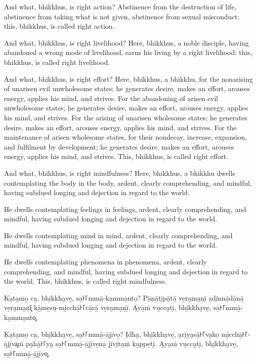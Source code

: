 And what, bhikkhus, is right action? Abstinence from the destruction of life,
abstinence from taking what is not given, abstinence from sexual misconduct:
this, bhikkhus, is called right action.

And what, bhikkhus, is right livelihood? Here, bhikkhus, a noble disciple,
having abandoned a wrong mode of livelihood, earns his living by a right
livelihood: this, bhikkhus, is called right livelihood.

And what, bhikkhus, is right effort? Here, bhikkhus, a bhikkhu, for the
nonarising of unarisen evil unwholesome states; he generates desire, makes an
effort, arouses energy, applies his mind, and strives. For the abandoning of
arisen evil unwholesome states; he generates desire, makes an effort, arouses
energy, applies his mind, and strives. For the arising of unarisen wholesome
states; he generates desire, makes an effort, arouses energy, applies his mind,
and strives. For the maintenance of arisen wholesome states, for their nondecay,
increase, expansion, and fulfilment by development; he generates desire, makes
an effort, arouses energy, applies his mind, and strives. This, bhikkhus, is
called right effort.

And what, bhikkhus, is right mindfulness? Here, bhikkhus, a bhikkhu dwells
contemplating the body in the body, ardent, clearly comprehending, and mindful,
having subdued longing and dejection in regard to the world.

He dwells contemplating feelings in feelings, ardent, clearly comprehending, and
mindful, having subdued longing and dejection in regard to the world.

He dwells contemplating mind in mind, ardent, clearly comprehending, and
mindful, having subdued longing and dejection in regard to the world.

He dwells contemplating phenomena in phenomena, ardent, clearly comprehending,
and mindful, having subdued longing and dejection in regard to the world. This,
bhikkhus, is called right mindfulness.

\paliPage

Ka̮ta̮mo̱ ca̮, bhi̱kkha̮ve̱, sa̱꜔꜒mmā̱-ka̱mma̱nto̱? Pā̱ṇā̱ti̮pā̱tā̱ ve̱ra̮ma̮ṇī̱ a̮di̱nnā̱dā̱nā̱ ve̱ra̮ma̮ṇī͓
kā̱me̱su̮-mi̱cchā̱꜔꜒cā̱rā̱ ve̱ra̮ma̮ṇī̱. A̮ya̱ṁ vu̱cca̮ti̮, bhi̱kkha̮ve̱, sa̱꜔꜒mmā̱-ka̱mma̱nto͓.

Ka̮ta̮mo̱ ca̮, bhi̱kkha̮ve̱, sa̱꜔꜒mmā̱-ā̱jī̱vo̱? I̮dha̮, bhi̱kkha̮ve̱, a̮ri̮ya̮sā̱꜔꜒va̮ko̱ mi̱cchā̱꜔꜒-ā̱jī̱va͓ṁ
pa̮hā̱꜔꜒ya̮ sa̱꜔꜒mmā̱-ā̱jī̱ve̱na̮ jī̱vi̮ta̱ṁ ka̱ppe̱ti̮. A̮ya̱ṁ vu̱cca̮ti̮, bhi̱kkha̮ve̱, sa̱꜔꜒mmā̱-ā̱jī̱vo͓.

